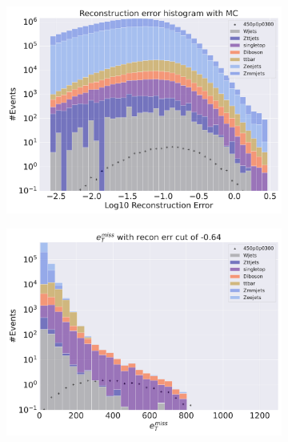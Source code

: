 \begin{figure}[H]
    \centering
    \begin{subfigure}{.40\textwidth}
        \includegraphics[width=\textwidth]{Figures/VAE_testing/small/2lep/b_data_recon_big_rm3_feats_sig_450p0p0300_.pdf}
        \caption{ }
        \label{fig:VAE_2lep_small_450_2}
    \end{subfigure}
    \hfill
    \begin{subfigure}{.40\textwidth}
        \includegraphics[width=\textwidth]{Figures/VAE_testing/small/2lep/b_data_recon_big_rm3_feats_sig_450p0p0300_recon_errcut_-0.64.pdf}
        \caption{}
        \label{fig:VAE_2lep_small_etmiss_450_2}
    \end{subfigure}

\end{figure}
